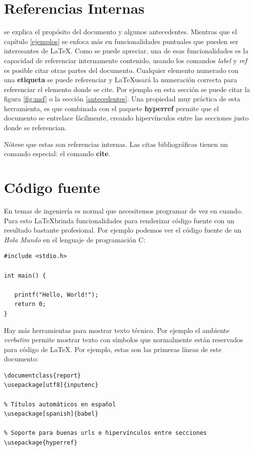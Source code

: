\documentclass[10pt]{report}
\begin{document}
\section{Referencias Internas}\label{referencias}
se explica el propósito del documento y algunos antecedentes. Mientras que el capítulo \ref{ejemplos} se enfoca más en funcionalidades puntuales que pueden ser interesantes de \LaTeX. Como se puede apreciar, una de esas funcionalidades es la capacidad de referenciar internamente contenido, usando los comandos \textit{label} y \textit{ref} es posible citar otras partes del documento. Cualquier elemento numerado con una \textbf{etiqueta} se puede referenciar y \LaTeX usará la numeración correcta para referenciar el elemento donde se cite. Por ejemplo en esta sección se puede citar la figura \ref{fig:msf} o la sección \ref{antecedentes}. Una propiedad muy práctica de esta herramienta, es que combinada con el paquete \textbf{hyperref} permite que el documento se entrelace fácilmente, creando hipervínculos entre las secciones justo donde se referencian.

Nótese que estas son referencias internas. Las citas bibliográficas tienen un comando especial: el comando \textbf{cite}.

\section{Código fuente}
En temas de ingeniería es normal que necesitemos programar de vez en cuando. Para esto \LaTeX brinda funcionalidades para renderizar código fuente con un resultado bastante profesional.
Por ejemplo podemos ver el código fuente de un \textit{Hola Mundo} en el lenguaje de programación C:

\begin{lstlisting}
#include <stdio.h>

int main() {
   
   printf("Hello, World!");
   return 0;
}
\end{lstlisting}

Hay más herramientas para mostrar texto técnico. Por ejemplo el ambiente \textit{verbatim} permite mostrar texto con símbolos que normalmente están reservados para código de \LaTeX. Por ejemplo, estas son las primeras líneas de este documento:

\begin{verbatim}
\documentclass{report}
\usepackage[utf8]{inputenc}

% Títulos automáticos en español
\usepackage[spanish]{babel}

% Soporte para buenas urls e hipervínculos entre secciones
\usepackage{hyperref}
\end{verbatim}
\end{document}
